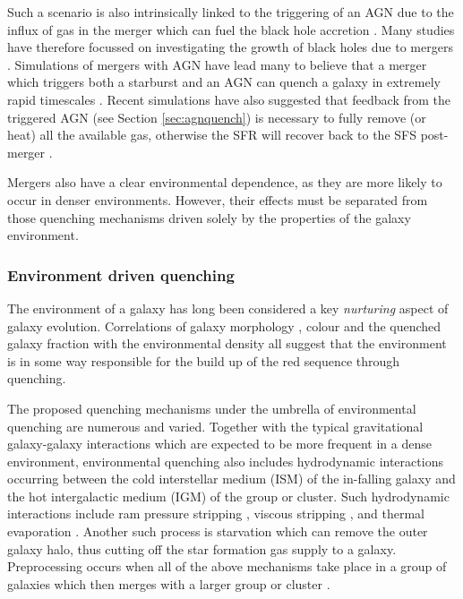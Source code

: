 Such a scenario is also intrinsically linked to the triggering of an AGN due to the influx of gas in the merger which can fuel the black hole accretion \citep{sanders88, dimatteo05, hopkins09a, treister12}. Many studies have therefore focussed on investigating the growth of black holes due to mergers \citep[e.g.][]{veilleux02, bellovary13, ellison13, medling15, gabor16}. Simulations of mergers with AGN have lead many to believe that a merger which triggers both a starburst and an AGN can quench a galaxy in extremely rapid timescales \citep{springel05b, bell06}. Recent simulations have also suggested that feedback from the triggered AGN (see Section \ref{sec:agnquench}) is necessary to fully remove (or heat) all the available gas, otherwise the SFR will recover back to the SFS post-merger \citep{pontzen16, sparre16}. 

Mergers also have a clear environmental dependence, as they are more likely to occur in denser environments. However, their effects must be separated from those quenching mechanisms driven solely by the properties of the galaxy environment. 

\subsubsection{Environment driven quenching}\label{sec:envquench}

The environment of a galaxy has long been considered a key  \emph{nurturing} aspect of galaxy evolution. Correlations of galaxy morphology \citep{dressler80, smail97, poggianti99, postman05, Bamford09}, colour \citep{butcher78, pimbblet02} and the quenched galaxy fraction \citep{kauffmann03, Baldry06, peng12, darvish16} with the environmental density all suggest that the environment is in some way responsible for the build up of the red sequence through quenching. 

The proposed quenching mechanisms under the umbrella of environmental quenching are numerous and varied. Together with the typical gravitational galaxy-galaxy interactions \citep{moore96} which are expected to be more frequent in a dense environment, environmental quenching also includes hydrodynamic interactions occurring between the cold interstellar medium (ISM) of the in-falling galaxy and the hot intergalactic medium (IGM) of the group or cluster. Such hydrodynamic interactions include ram pressure stripping \citep{gunngott72}, viscous stripping \citep{nulsen82}, and thermal evaporation \citep[a rapid rise in temperature of the ISM due to contact with the IGM;][]{cowie77}. Another such process is starvation \citep[also called strangulation;][]{larson80} which can remove the outer galaxy halo, thus cutting off the star formation gas supply to a galaxy. Preprocessing occurs when all of the above mechanisms take place in a group of galaxies which then merges with a larger group or cluster \citep{dressler04}. 

